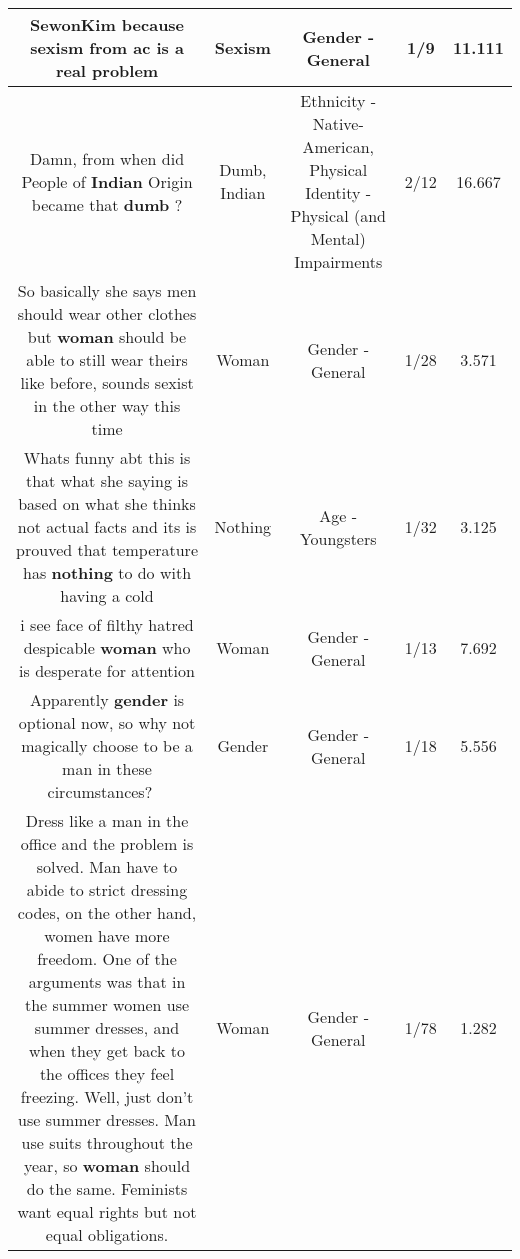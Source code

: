 \documentclass[11pt]{article}
\newlength\mylength
\begin{document}
\begin{center}
\begin{longtable}{|C{.65\mylength}|C{.30\mylength}|C{.12\mylength}|C{.12\mylength}|C{.12\mylength}|}
  \small SewonKim because \textbf{sexism} from ac is a real problem\normalsize   & Sexism & Gender - General & 1/9 & 11.111 \\  \hline
  \small Damn, from when did People of \textbf{Indian} Origin became that \textbf{dumb} ?\normalsize   & Dumb, Indian & Ethnicity - Native-American, Physical Identity - Physical (and Mental) Impairments & 2/12 & 16.667 \\  \hline
  \small So basically she says men should wear other clothes but \textbf{woman} should be able to still wear theirs like before, sounds sexist in the other way this time\normalsize   & Woman & Gender - General & 1/28 & 3.571 \\  \hline
  \small Whats funny abt this is that what she saying is based on what she thinks not actual facts and its is prouved that temperature has \textbf{nothing} to do with having a cold\normalsize   & Nothing & Age - Youngsters & 1/32 & 3.125 \\  \hline
  \small i see face of filthy hatred despicable \textbf{woman} who is desperate for attention\normalsize   & Woman & Gender - General & 1/13 & 7.692 \\  \hline
  \small Apparently \textbf{gender} is optional now, so why not magically choose to be a man in these circumstances? 👀😂\normalsize   & Gender & Gender - General & 1/18 & 5.556 \\  \hline
  \small Dress like a man in the office and the problem is solved. Man have to abide to strict dressing codes, on the other hand, women have more freedom. One of the arguments was that in the summer women use summer dresses, and when they get back to the offices they feel freezing. Well, just don't use summer dresses. Man use suits throughout the year, so \textbf{woman} should do the same. Feminists want equal rights but not equal obligations.\normalsize   & Woman & Gender - General & 1/78 & 1.282 \\  \hline

\end{longtable}
\end{center}
\end{document}
